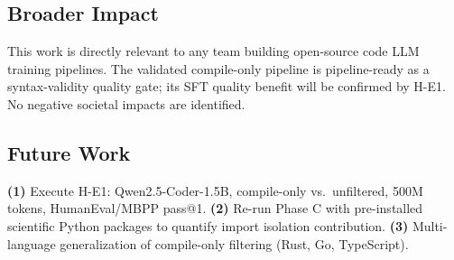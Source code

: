 \subsection{Broader Impact}

This work is directly relevant to any team building open-source code LLM training pipelines.
The validated compile-only pipeline is pipeline-ready as a syntax-validity quality gate;
its SFT quality benefit will be confirmed by H-E1. No negative societal impacts are identified.

\subsection{Future Work}

\textbf{(1)} Execute H-E1: Qwen2.5-Coder-1.5B, compile-only vs.\ unfiltered, 500M tokens,
HumanEval/MBPP pass@1. \textbf{(2)} Re-run Phase C with pre-installed scientific Python
packages to quantify import isolation contribution. \textbf{(3)} Multi-language generalization
of compile-only filtering (Rust, Go, TypeScript).
